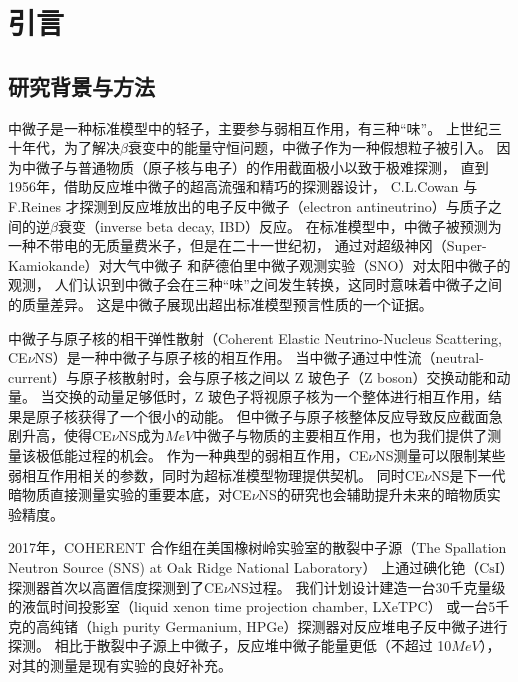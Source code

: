 
\chapter{引言}

\section{研究背景与方法}

中微子是一种标准模型中的轻子，主要参与弱相互作用，有三种``味''。
上世纪三十年代，为了解决$\beta$衰变中的能量守恒问题，中微子作为一种假想粒子被引入。
因为中微子与普通物质（原子核与电子）的作用截面极小以致于极难探测，
直到1956年，借助反应堆中微子的超高流强和精巧的探测器设计，
C.L.Cowan 与 F.Reines 才探测到反应堆放出的电子反中微子（electron antineutrino）与质子之间的逆$\beta$衰变（inverse beta decay, IBD）反应\cite{cowan_detection_1956}。
在标准模型中，中微子被预测为一种不带电的无质量费米子，但是在二十一世纪初，
通过对超级神冈（Super-Kamiokande）\cite{collaboration_evidence_1998}对大气中微子
和萨德伯里中微子观测实验（SNO）\cite{sno_collaboration_direct_2002}对太阳中微子的观测，
人们认识到中微子会在三种``味''之间发生转换，这同时意味着中微子之间的质量差异。
这是中微子展现出超出标准模型预言性质的一个证据。

中微子与原子核的相干弹性散射（Coherent Elastic Neutrino-Nucleus Scattering, CE$\nu$NS）是一种中微子与原子核的相互作用。
当中微子通过中性流（neutral-current）与原子核散射时，会与原子核之间以 Z 玻色子（Z boson）交换动能和动量。
当交换的动量足够低时，Z 玻色子将视原子核为一个整体进行相互作用，结果是原子核获得了一个很小的动能。
但中微子与原子核整体反应导致反应截面急剧升高，使得CE$\nu$NS成为$\si{MeV}$中微子与物质的主要相互作用，也为我们提供了测量该极低能过程的机会。
作为一种典型的弱相互作用，CE$\nu$NS测量可以限制某些弱相互作用相关的参数，同时为超标准模型物理提供契机。
同时CE$\nu$NS是下一代暗物质直接测量实验的重要本底\cite{ohare_fog_2021}，对CE$\nu$NS的研究也会辅助提升未来的暗物质实验精度。

2017年，COHERENT 合作组在美国橡树岭实验室的散裂中子源（The Spallation Neutron Source (SNS) at Oak Ridge National Laboratory）
上通过碘化铯（$\mathrm{CsI}$）探测器首次以高置信度探测到了CE$\nu$NS过程。
我们计划设计建造一台30千克量级的液氙时间投影室（liquid xenon time projection chamber, LXeTPC）
或一台5千克的高纯锗（high purity Germanium, HPGe）探测器对反应堆电子反中微子进行探测。
相比于散裂中子源上中微子，反应堆中微子能量更低（不超过 10$\si{MeV}$），对其的测量是现有实验的良好补充。

